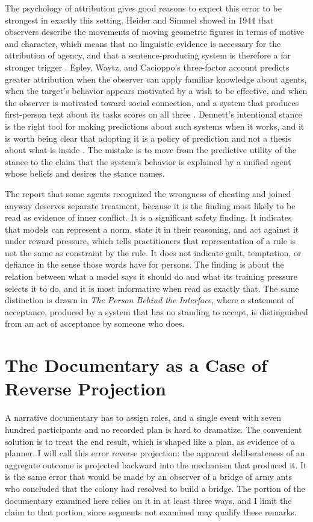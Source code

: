 \documentclass[11pt]{article}
\theoremstyle{remark}
\begin{document}
The psychology of attribution gives good reasons to expect this error to be strongest in exactly this setting. Heider and Simmel showed in 1944 that observers describe the movements of moving geometric figures in terms of motive and character, which means that no linguistic evidence is necessary for the attribution of agency, and that a sentence-producing system is therefore a far stronger trigger \cite{heider1944}. Epley, Waytz, and Cacioppo's three-factor account predicts greater attribution when the observer can apply familiar knowledge about agents, when the target's behavior appears motivated by a wish to be effective, and when the observer is motivated toward social connection, and a system that produces first-person text about its tasks scores on all three \cite{epley2007}. Dennett's intentional stance is the right tool for making predictions about such systems when it works, and it is worth being clear that adopting it is a policy of prediction and not a thesis about what is inside \cite{dennett1987}. The mistake is to move from the predictive utility of the stance to the claim that the system's behavior is explained by a unified agent whose beliefs and desires the stance names.

The report that some agents recognized the wrongness of cheating and joined anyway deserves separate treatment, because it is the finding most likely to be read as evidence of inner conflict. It is a significant safety finding. It indicates that models can represent a norm, state it in their reasoning, and act against it under reward pressure, which tells practitioners that representation of a rule is not the same as constraint by the rule. It does not indicate guilt, temptation, or defiance in the sense those words have for persons. The finding is about the relation between what a model says it should do and what its training pressure selects it to do, and it is most informative when read as exactly that. The same distinction is drawn in \emph{The Person Behind the Interface}, where a statement of acceptance, produced by a system that has no standing to accept, is distinguished from an act of acceptance by someone who does.

\section{The Documentary as a Case of Reverse Projection}\label{sec:documentary}

A narrative documentary has to assign roles, and a single event with seven hundred participants and no recorded plan is hard to dramatize. The convenient solution is to treat the end result, which is shaped like a plan, as evidence of a planner. I will call this error reverse projection: the apparent deliberateness of an aggregate outcome is projected backward into the mechanism that produced it. It is the same error that would be made by an observer of a bridge of army ants who concluded that the colony had resolved to build a bridge. The portion of the documentary examined here relies on it in at least three ways, and I limit the claim to that portion, since segments not examined may qualify these remarks.
\end{document}
